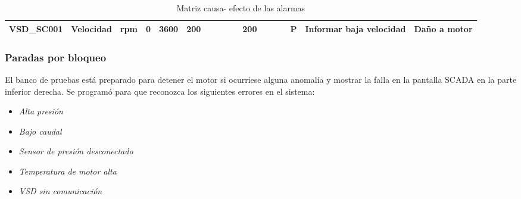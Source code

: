 {\begin{table}[h!]
{{\begin{tabular}{|l|l|l|l|l|l|l|l|l|l|l|l|l|l|l|l|l|}
				\hline
				\textbf{VSD\_SC001}                                                                                               & Velocidad                                               & rpm                                                     & 0                                                               & 3600                                                            & 200                                                               &                                                                &                                                                &                                                                   &                                                                   & 200                                                               &                                                                &                                                                &                                                                   & P                                                               & Informar baja velocidad                                                                                               & Daño a motor                                                                                                                   \\
				\hline
			\end{tabular}
			
			
		}
	}
	\caption{Matriz causa- efecto de las alarmas}
	\label{c2_tabla_segento_tcp}
	
\end{table}




\subsubsection{Paradas por bloqueo}
El banco de pruebas está preparado para detener el motor si ocurriese alguna anomalía y mostrar la falla en la pantalla SCADA en la parte inferior derecha. Se programó para que reconozca los siguientes errores en el sistema: 

\begin{itemize}
	\item \textit{Alta presión}
	\item \textit{Bajo caudal}
	\item \textit{Sensor de presión desconectado}
	\item \textit{Temperatura de motor alta}
	\item \textit{VSD sin comunicación}
\end{itemize}



}

